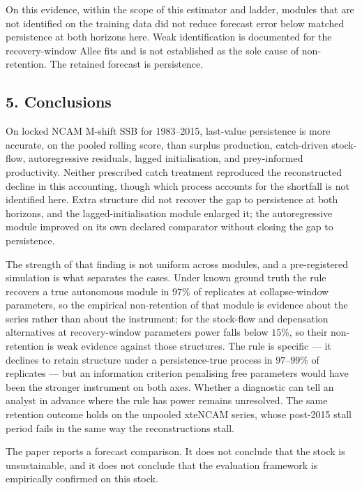 \documentclass[11pt]{article}
\begin{document}
On this evidence, within the scope of this estimator and ladder, modules
that are not identified on the training data did not reduce forecast
error below matched persistence at both horizons here. Weak
identification is documented for the recovery-window Allee fits and is
not established as the sole cause of non-retention. The retained
forecast is persistence.

\subsection{5. Conclusions}\label{conclusions}

On locked NCAM M-shift SSB for 1983--2015, last-value persistence is
more accurate, on the pooled rolling score, than surplus production,
catch-driven stock-flow, autoregressive residuals, lagged
initialisation, and prey-informed productivity. Neither prescribed catch
treatment reproduced the reconstructed decline in this accounting,
though which process accounts for the shortfall is not identified here. Extra structure did
not recover the gap to persistence at both horizons, and the
lagged-initialisation module enlarged it; the autoregressive module
improved on its own declared comparator without closing the gap
to persistence.

The strength of that finding is not uniform across modules, and a
pre-registered simulation is what separates the cases. Under known
ground truth the rule recovers a true autonomous module in \(97\%\) of
replicates at collapse-window parameters, so the empirical
non-retention of that module is evidence about the series rather than
about the instrument; for the stock-flow and depensation alternatives at
recovery-window parameters power falls below \(15\%\), so their
non-retention is weak evidence against those structures. The rule is
specific --- it declines to retain structure under a persistence-true
process in \(97\)--\(99\%\) of replicates --- but an information
criterion penalising free parameters would have been the stronger
instrument on both axes. Whether a diagnostic can tell an analyst in
advance where the rule has power remains unresolved. The same
retention outcome holds on the unpooled xteNCAM series, whose post-2015
stall period fails in the same way the reconstructions stall.

The paper reports a forecast comparison. It does not conclude that the
stock is unsustainable, and it does not conclude that the evaluation
framework is empirically confirmed on this stock.
\end{document}
